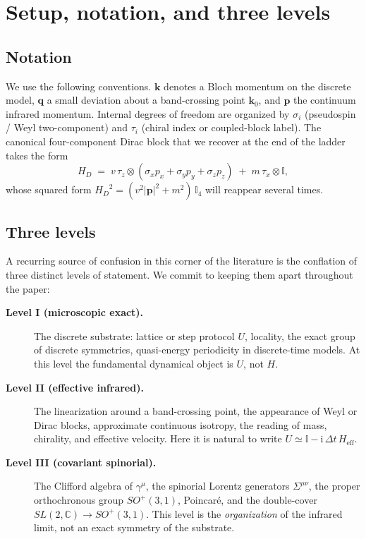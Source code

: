 \documentclass[a4paper,onecolumn,11pt]{quantumarticle}
\newcommand{\ii}{\ensuremath{\mathrm{i}}}
\newcommand{\bbI}{\ensuremath{\mathbb{I}}}
\newcommand{\bbC}{\ensuremath{\mathbb{C}}}
\def\vk{\ensuremath{\bm{k}}}
\def\vq{\ensuremath{\bm{q}}}
\def\vp{\ensuremath{\bm{p}}}
\newcommand{\Hop}{\ensuremath{H}}
\newcommand{\Uop}{\ensuremath{U}}
\newcommand{\HD}{\ensuremath{H_{D}}}
\newcommand{\gmu}{\ensuremath{\gamma^{\mu}}}
\newcommand{\sigmunu}{\ensuremath{\Sigma^{\mu\nu}}}
\begin{document}
\section{Setup, notation, and three levels}
\label{p:setup}

\subsection{Notation}
We use the following conventions.
$\vk$ denotes a Bloch momentum on the discrete model, $\vq$ a small
deviation about a band-crossing point $\vk_{0}$, and $\vp$ the continuum
infrared momentum. Internal degrees of freedom are organized by
$\sigma_{i}$ (pseudospin / Weyl two-component) and $\tau_{i}$ (chiral
index or coupled-block label). The canonical four-component Dirac block
that we recover at the end of the ladder takes the form
\begin{equation}
\HD \;=\; v\,\tau_{z} \otimes (\sigma_{x} p_{x} + \sigma_{y} p_{y} + \sigma_{z} p_{z})
            \;+\; m\,\tau_{x}\otimes\bbI ,
\label{p:eq:HDcanon}
\end{equation}
whose squared form
$\HD^{2} = (v^{2}\lvert \vp\rvert^{2} + m^{2})\,\bbI_{4}$
will reappear several times.

\subsection{Three levels}
A recurring source of confusion in this corner of the literature is the
conflation of three distinct levels of statement. We commit to keeping
them apart throughout the paper:

\begin{description}
\item[\textbf{Level I (microscopic exact).}]
    The discrete substrate: lattice or step protocol $\Uop$, locality, the
    exact group of discrete symmetries, quasi-energy periodicity in
    discrete-time models. At this level the fundamental dynamical object
    is $\Uop$, not $\Hop$.
\item[\textbf{Level II (effective infrared).}]
    The linearization around a band-crossing point, the appearance of
    Weyl or Dirac blocks, approximate continuous isotropy, the reading
    of mass, chirality, and effective velocity. Here it is natural to
    write $\Uop \simeq \bbI - \ii\,\Delta t\,\Hop_{\mathrm{eff}}$.
\item[\textbf{Level III (covariant spinorial).}]
    The Clifford algebra of $\gmu$, the spinorial Lorentz generators
    $\sigmunu$, the proper orthochronous group $SO^{+}(3,1)$,
    Poincar\'e, and the double-cover $SL(2,\bbC) \to SO^{+}(3,1)$. This
    level is the \emph{organization} of the infrared limit, not an exact
    symmetry of the substrate.
\end{description}
\end{document}
